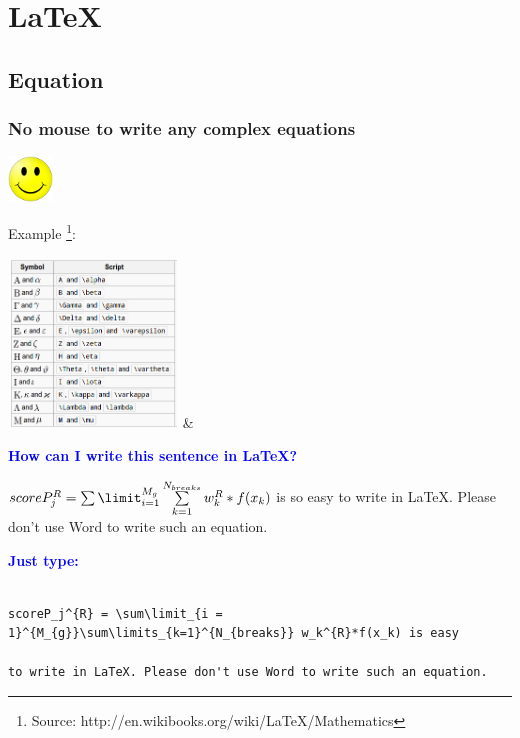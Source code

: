 \documentclass[]{beamer}
\begin{document}
\section{\LaTeX}

\subsection{Equation}

\begin{frame}[fragile] \frametitle{No mouse to write any complex equations}

\includegraphics[width = 1.2cm, height = 1.2cm]{SmileFace.png}

\vspace{0.8cm}
Example \footnote{Source: http://en.wikibooks.org/wiki/LaTeX/Mathematics}:

\centering
\includegraphics[width = 4.5cm, height = 4.5cm]{mathSource.png} & \\
\end{frame}

\begin{frame}[fragile]


\textcolor{blue}{\bf{How can I write this sentence in \LaTeX?}}

\vspace{0.8cm}

\tiny

$scoreP_j^{R} = \sum\limit_{i = 1}^{M_{g}}\sum\limits_{k=1}^{N_{breaks}} w_k^{R}*f(x_k) $ is so easy to write in \LaTeX. Please don't use Word to write such an equation.

\large

\vspace{1cm}
\textcolor{blue}{\bf{Just type:}}
\vspace{0.8cm}
\tiny


\begin{verbatim}

scoreP_j^{R} = \sum\limit_{i = 1}^{M_{g}}\sum\limits_{k=1}^{N_{breaks}} w_k^{R}*f(x_k) is easy 

to write in LaTeX. Please don't use Word to write such an equation.

\end{verbatim}

\end{frame}
\end{document}
